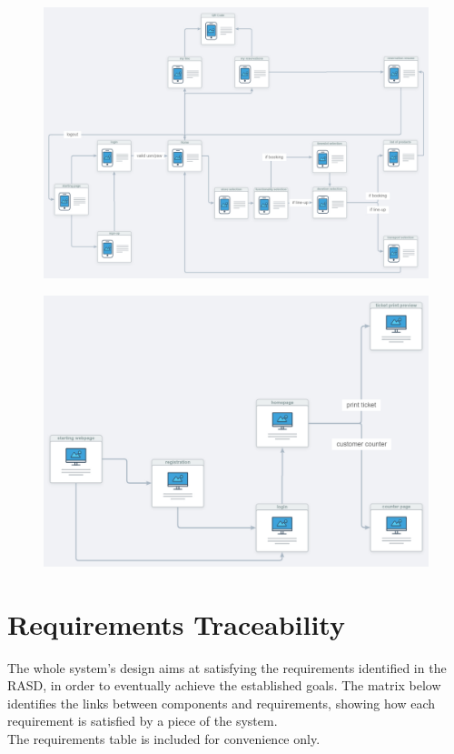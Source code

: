 \documentclass{article}
\begin{document}
\begin{figure}[H]
  \includegraphics[width=\linewidth]{appUX.jpg}
  
\end{figure}


\begin{figure}[H]
  \includegraphics[width=\linewidth]{webUX.jpg}
  
\end{figure}

\section{Requirements Traceability}
The whole system’s design aims at satisfying the requirements identified in the RASD, in order to eventually achieve the established goals. The matrix below identifies the links between components and requirements, showing how each requirement is satisfied by a piece of the system.\\
The requirements table is included for convenience only.\\
\end{document}
